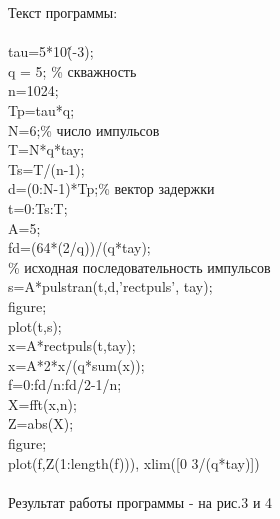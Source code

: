 \documentclass[12pt,a4paper]{scrartcl}
\begin{document}
Текст программы:\\
\\
tau=5*10\^(-3); \\
q = 5; \% скважность\\
n=1024;\\
Tp=tau*q;\\
N=6;\% число импульсов\\
T=N*q*tay; \\
Ts=T/(n-1);\\
d=(0:N-1)*Tp;\% вектор задержки \\
t=0:Ts:T; \\
A=5;\\
fd=(64*(2/q))/(q*tay);\\
\% исходная последовательность импульсов\\
s=A*pulstran(t,d,'rectpuls', tay);\\
figure;\\
plot(t,s);\\
x=A*rectpuls(t,tay);\\
x=A*2*x/(q*sum(x));\\
f=0:fd/n:fd/2-1/n;\\
X=fft(x,n);\\
Z=abs(X);\\
figure;\\
plot(f,Z(1:length(f))), xlim([0 3/(q*tay)])\\
\\
Результат работы программы - на рис.3 и 4\\
\end{document}
